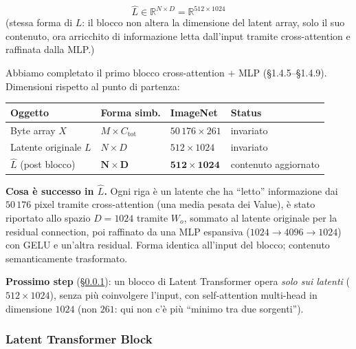 \documentclass[
  11pt,
]{article}
\begin{document}
\begin{formulabox}[title={\textbf{Output del blocco}}]
\[
\hat{L} \in \mathbb{R}^{N \times D} = \mathbb{R}^{512 \times 1024}
\]
\centering\small
(stessa forma di $L$: il blocco non altera la dimensione del latent array, solo il suo contenuto, ora arricchito di informazione letta dall'input tramite cross-attention e raffinata dalla MLP.)
\end{formulabox}

\begin{notabox}[title={\textbf{Checkpoint dimensioni --- fine blocco Cross-Attention}}]
Abbiamo completato il primo blocco cross-attention $+$ MLP (\S1.4.5--\S1.4.9). Dimensioni rispetto al punto di partenza:

\medskip
\begin{center}\small
\setlength{\tabcolsep}{5pt}
\begin{tabular}{@{}llll@{}}
\toprule
\textbf{Oggetto} & \textbf{Forma simb.} & \textbf{ImageNet} & \textbf{Status} \\
\midrule
Byte array $X$ & $M \times C_{\text{tot}}$ & $50\,176 \times 261$ & invariato \\
Latente originale $L$ & $N \times D$ & $512 \times 1024$ & invariato \\
$\widehat{L}$ (post blocco) & $\boldsymbol{N \times D}$ & $\mathbf{512 \times 1024}$ & contenuto aggiornato \\
\bottomrule
\end{tabular}
\end{center}

\medskip
\textbf{Cosa è successo in $\widehat{L}$.} Ogni riga è un latente che ha ``letto'' informazione dai $50\,176$ pixel tramite cross-attention (una media pesata dei Value), è stato riportato allo spazio $D = 1024$ tramite $W_o$, sommato al latente originale per la residual connection, poi raffinato da una MLP espansiva ($1024 \to 4096 \to 1024$) con GELU e un'altra residual. Forma identica all'input del blocco; contenuto semanticamente trasformato.

\medskip
\textbf{Prossimo step} (\S\ref{sec:latent-transformer}): un blocco di Latent Transformer opera \emph{solo sui latenti} ($512 \times 1024$), senza più coinvolgere l'input, con self-attention multi-head in dimensione $1024$ (non $261$: qui non c'è più ``minimo tra due sorgenti'').
\end{notabox}

\clearpage
\subsubsection{Latent Transformer Block}
\label{sec:latent-transformer}
\end{document}
